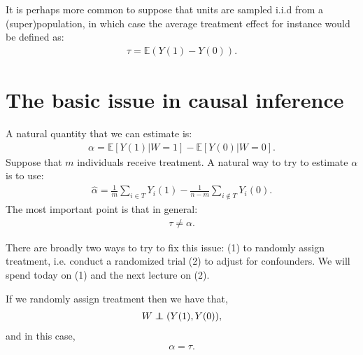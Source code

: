 \documentclass[twoside,12pt]{article}
\begin{document}
It is perhaps more common to suppose that units are sampled i.i.d from a (super)population, in which case the average treatment effect for instance would be defined as:
\begin{align*}
\tau = \mathbb{E} (Y(1) - Y(0)).
\end{align*}


\section{The basic issue in causal inference}
A natural quantity that we can estimate is:
\begin{align*}
\alpha = \mathbb{E}[Y(1) | W = 1] - \mathbb{E}[Y(0) | W = 0].
\end{align*}
Suppose that $m$ individuals receive treatment. 
A natural way to try to estimate $\alpha$ is to use:
\begin{align*}
\widehat{\alpha} =  \frac{1}{m} \sum_{i \in T} Y_i(1) - \frac{1}{n - m} \sum_{i \notin T} Y_i(0).
\end{align*}
The most important point is that in general:
\begin{align*}
\tau \neq \alpha.
\end{align*}

There are broadly two ways to try to fix this issue: (1) to randomly assign treatment, i.e. conduct a randomized trial (2) to adjust for confounders.
We will spend today on (1) and the next lecture on (2).

\newcommand\independent{\protect\mathpalette{\protect\independenT}{\perp}}
\def\independenT#1#2{\mathrel{\rlap{$#1#2$}\mkern2mu{#1#2}}}

If we randomly assign treatment then we have that,
\begin{align*}
W \independent (Y(1), Y(0)),
\end{align*}
and in this case,
\begin{align*}
\alpha = \tau.
\end{align*}
\end{document}
